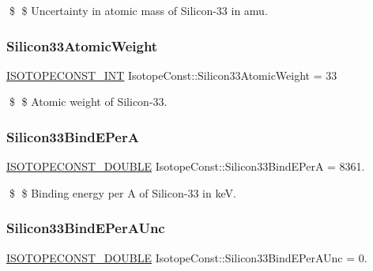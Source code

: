 \$ \$ Uncertainty in atomic mass of Silicon-\/33 in amu. \mbox{\label{group___isotope_const-_silicon-_si33_ga4ce75e82e3fc8169506854950b432339}} 
\subsubsection{\texorpdfstring{Silicon33\+Atomic\+Weight}{Silicon33AtomicWeight}}
{\footnotesize\ttfamily \mbox{\hyperlink{group___isotope_const-_macros_ga5f18360b3e99483a35c32d789e62621c}{I\+S\+O\+T\+O\+P\+E\+C\+O\+N\+S\+T\+\_\+\+I\+NT}} Isotope\+Const\+::\+Silicon33\+Atomic\+Weight = 33}

\$ \$ Atomic weight of Silicon-\/33. \mbox{\label{group___isotope_const-_silicon-_si33_ga54df6bb6217d38a57cba63a14b4a23e6}} 
\subsubsection{\texorpdfstring{Silicon33\+Bind\+E\+PerA}{Silicon33BindEPerA}}
{\footnotesize\ttfamily \mbox{\hyperlink{group___isotope_const-_macros_ga8f45a7272ce02c0b4c65c44636ed719a}{I\+S\+O\+T\+O\+P\+E\+C\+O\+N\+S\+T\+\_\+\+D\+O\+U\+B\+LE}} Isotope\+Const\+::\+Silicon33\+Bind\+E\+PerA = 8361.}

\$ \$ Binding energy per A of Silicon-\/33 in keV. \mbox{\label{group___isotope_const-_silicon-_si33_gac334a5d88a07271a827602fcf3ec274d}} 
\subsubsection{\texorpdfstring{Silicon33\+Bind\+E\+Per\+A\+Unc}{Silicon33BindEPerAUnc}}
{\footnotesize\ttfamily \mbox{\hyperlink{group___isotope_const-_macros_ga8f45a7272ce02c0b4c65c44636ed719a}{I\+S\+O\+T\+O\+P\+E\+C\+O\+N\+S\+T\+\_\+\+D\+O\+U\+B\+LE}} Isotope\+Const\+::\+Silicon33\+Bind\+E\+Per\+A\+Unc = 0.}

